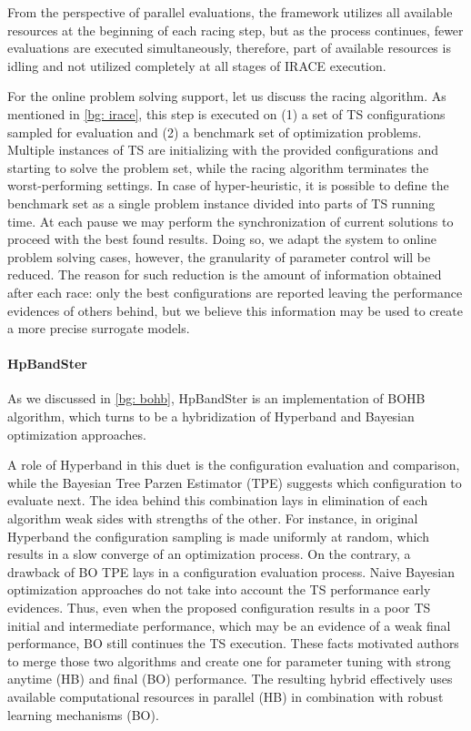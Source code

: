 From the perspective of parallel evaluations, the framework utilizes all available resources at the beginning of each racing step, but as the process continues, fewer evaluations are executed simultaneously, therefore, part of available resources is idling and not utilized completely at all stages of IRACE execution.

For the online problem solving support, let us discuss the racing algorithm. As mentioned in \cref{bg: irace}, this step is executed on (1) a set of TS configurations sampled for evaluation and (2) a benchmark set of optimization problems. Multiple instances of TS are initializing with the provided configurations and starting to solve the problem set, while the racing algorithm terminates the worst-performing settings. In case of hyper-heuristic, it is possible to define the benchmark set as a single problem instance divided into parts of TS running time. At each pause we may perform the synchronization of current solutions to proceed with the best found results. Doing so, we adapt the system to online problem solving cases, however, the granularity of parameter control will be reduced. The reason for such reduction is the amount of information obtained after each race: only the best configurations are reported leaving the performance evidences of others behind, but we believe this information may be used to create a more precise surrogate models.

\paragraph{HpBandSter} As we discussed in \cref{bg: bohb}, HpBandSter is an implementation of BOHB algorithm, which turns to be a hybridization of Hyperband and Bayesian optimization approaches.

A role of Hyperband in this duet is the configuration evaluation and comparison, while the Bayesian Tree Parzen Estimator (TPE) suggests which configuration to evaluate next. The idea behind this combination lays in elimination of each algorithm weak sides with strengths of the other. For instance, in original Hyperband the configuration sampling is made uniformly at random, which results in a slow converge of an optimization process. On the contrary, a drawback of BO TPE lays in a configuration evaluation process. Naive Bayesian optimization approaches do not take into account the TS performance early evidences. Thus, even when the proposed configuration results in a poor TS initial and intermediate performance, which may be an evidence of a weak final performance, BO still continues the TS execution. These facts motivated authors to merge those two algorithms and create one for parameter tuning with strong anytime (HB) and final (BO) performance. The resulting hybrid effectively uses available computational resources in parallel (HB) in combination with robust learning mechanisms (BO).

